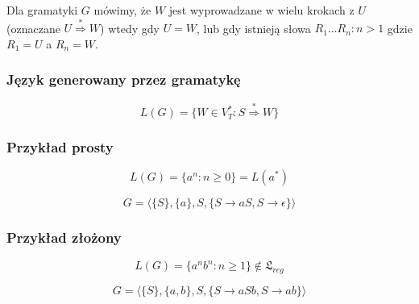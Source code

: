 \documentclass{../notatki}
\begin{document}
Dla gramatyki $G$ mówimy, że $W$ jest wyprowadzane w wielu krokach z $U$ (oznaczane $U \stackrel{*}{\Rightarrow} W$) wtedy gdy $U=W$, lub gdy istnieją słowa $R_1 \dots R_n : n > 1$ gdzie $R_1 = U$ a $R_n=W$.

\subsubsection{Język generowany przez gramatykę}

$$
L(G) = \{W \in V_T^* : S \stackrel{*}{\Rightarrow} W\}
$$

\subsubsection{Przykład prosty}

$$
L(G) = \{a^n : n \ge 0\} = L(a^*)
$$

$$
G = \langle \{S\}, \{a\}, S, \{S \rightarrow aS, S \rightarrow \epsilon\} \rangle
$$

\subsubsection{Przykład złożony}

$$
L(G) = \{a^nb^n : n \ge 1\} \notin \mathfrak{L}_{reg}
$$

$$
G = \langle \{S\}, \{a, b\}, S, \{S \rightarrow aSb, S \rightarrow ab\} \rangle
$$
\end{document}
